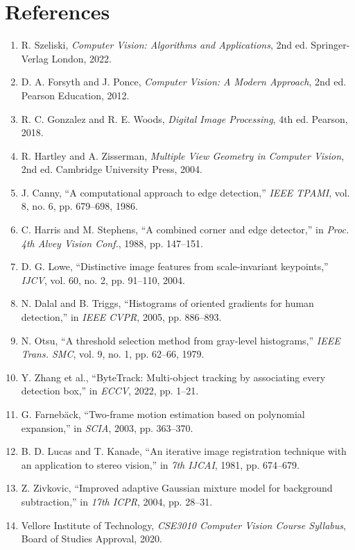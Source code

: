 \documentclass[12pt,a4paper]{article}
\begin{document}
\section{References}
\begin{enumerate}
    \item R. Szeliski, \textit{Computer Vision: Algorithms and Applications}, 2nd ed. Springer-Verlag London, 2022.
    \item D. A. Forsyth and J. Ponce, \textit{Computer Vision: A Modern Approach}, 2nd ed. Pearson Education, 2012.
    \item R. C. Gonzalez and R. E. Woods, \textit{Digital Image Processing}, 4th ed. Pearson, 2018.
    \item R. Hartley and A. Zisserman, \textit{Multiple View Geometry in Computer Vision}, 2nd ed. Cambridge University Press, 2004.
    \item J. Canny, ``A computational approach to edge detection,'' \textit{IEEE TPAMI}, vol. 8, no. 6, pp. 679--698, 1986.
    \item C. Harris and M. Stephens, ``A combined corner and edge detector,'' in \textit{Proc. 4th Alvey Vision Conf.}, 1988, pp. 147--151.
    \item D. G. Lowe, ``Distinctive image features from scale-invariant keypoints,'' \textit{IJCV}, vol. 60, no. 2, pp. 91--110, 2004.
    \item N. Dalal and B. Triggs, ``Histograms of oriented gradients for human detection,'' in \textit{IEEE CVPR}, 2005, pp. 886--893.
    \item N. Otsu, ``A threshold selection method from gray-level histograms,'' \textit{IEEE Trans. SMC}, vol. 9, no. 1, pp. 62--66, 1979.
    \item Y. Zhang et al., ``ByteTrack: Multi-object tracking by associating every detection box,'' in \textit{ECCV}, 2022, pp. 1--21.
    \item G. Farneb\"ack, ``Two-frame motion estimation based on polynomial expansion,'' in \textit{SCIA}, 2003, pp. 363--370.
    \item B. D. Lucas and T. Kanade, ``An iterative image registration technique with an application to stereo vision,'' in \textit{7th IJCAI}, 1981, pp. 674--679.
    \item Z. Zivkovic, ``Improved adaptive Gaussian mixture model for background subtraction,'' in \textit{17th ICPR}, 2004, pp. 28--31.
    \item Vellore Institute of Technology, \textit{CSE3010 Computer Vision Course Syllabus}, Board of Studies Approval, 2020.
\end{enumerate}
\end{document}
